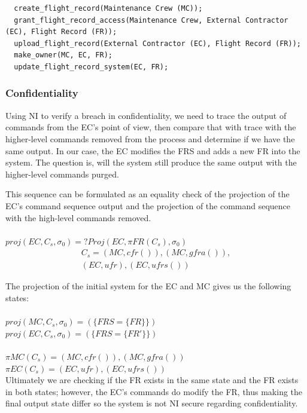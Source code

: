 \documentclass[10pt,journal,compsoc]{IEEEtran}
\begin{document}
\begin{lstlisting}
  create_flight_record(Maintenance Crew (MC));
  grant_flight_record_access(Maintenance Crew, External Contractor (EC), Flight Record (FR));
  upload_flight_record(External Contractor (EC), Flight Record (FR));
  make_owner(MC, EC, FR);
  update_flight_record_system(EC, FR);
\end{lstlisting}  

\subsubsection{Confidentiality}
Using NI to verify a breach in confidentiality, we need to trace the output of commands from the EC's point of view, then compare that with trace with the higher-level commands removed from the process and determine if we have the same output. In our case, the EC modifies the FRS and adds a new FR into the system. The question is, will the system still produce the same output with the higher-level commands purged.

This sequence can be formulated as an equality check of the projection of the EC's command sequence output and the projection of the command sequence with the high-level commands removed.  \\\\
$proj(EC, C_s, \sigma_0) =? Proj(EC, \pi FR(C_s), \sigma_0)$
\begin{equation*}
  \begin{aligned}
    C_s=(MC, cfr()), (MC, gfra()), \\
    (EC, ufr), (EC, ufrs())
  \end{aligned}
\end{equation*}

The projection of the initial system for the EC and MC gives us the following states: \\\\
$proj(MC, C_s, \sigma_0) = (\{FRS = \{FR\}\})$ \\
$proj(EC, C_s, \sigma_0) = (\{FRS = \{FR'\}\})$ \\\\
$\pi MC(C_s)=(MC, cfr()), (MC, gfra())$ \\
$\pi EC(C_s)=(EC, ufr), (EC, ufrs())$ \\

Ultimately we are checking if the FR exists in the same state and the FR exists in both states; however, the EC's commands do modify the FR, thus making the final output state differ so the system is not NI secure regarding confidentiality. 
\end{document}
